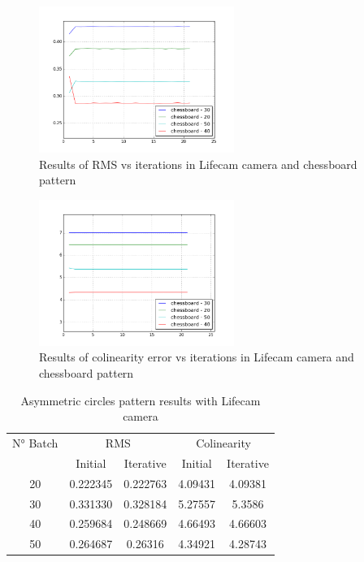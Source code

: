 \documentclass[journal]{IEEEtran}
\begin{document}
\begin{figure}[H]
\centering
\includegraphics[width=2.5in]{_img/report_4/img_results_lifecam_chessboard.png}
\caption{Results of RMS vs iterations in Lifecam camera and chessboard pattern}
\end{figure}

\begin{figure}[H]
\centering
\includegraphics[width=2.5in]{_img/report_4/img_results_lifecam_colinearity_chessboard.png}
\caption{Results of colinearity error vs iterations in Lifecam camera and chessboard pattern}
\end{figure}


\begin{table}[h]
\centering
\caption{Asymmetric circles pattern results with Lifecam camera}
\begin{tabular}{ |c||c|c|c|c|  }
 \hline
 N° Batch & \multicolumn{2}{c|}{RMS} & \multicolumn{2}{c|}{Colinearity}\\
 \cline{2-5}
 & Initial & Iterative & Initial & Iterative \\
 \hline
 20        & 0.222345 & 0.222763 & 4.09431 & 4.09381 \\
 30        & 0.331330 & 0.328184 & 5.27557 & 5.3586 \\
 40        & 0.259684 & 0.248669 & 4.66493 & 4.66603 \\
 50        & 0.264687 & 0.26316 & 4.34921 & 4.28743 \\
 \hline
\end{tabular}
\\
\end{table}
\end{document}
